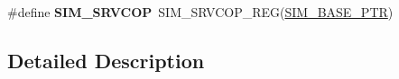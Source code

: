 \begin{DoxyCompactItemize}
\item 
\hypertarget{group___s_i_m___register___accessor___macros_ga31a4e51e0655268b6aa618acf0bd1ef4}{}\#define {\bfseries S\+I\+M\+\_\+\+S\+R\+V\+C\+O\+P}~S\+I\+M\+\_\+\+S\+R\+V\+C\+O\+P\+\_\+\+R\+E\+G(\hyperlink{group___s_i_m___peripheral_ga719ec5df95fbb5732438f794f2cccf3c}{S\+I\+M\+\_\+\+B\+A\+S\+E\+\_\+\+P\+T\+R})\label{group___s_i_m___register___accessor___macros_ga31a4e51e0655268b6aa618acf0bd1ef4}

\end{DoxyCompactItemize}


\subsection{Detailed Description}
